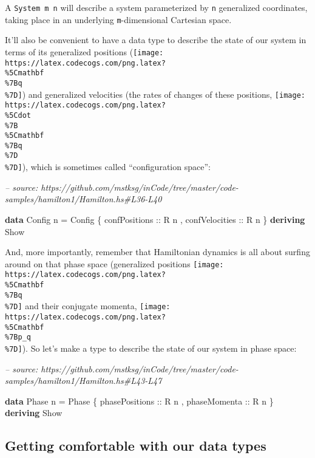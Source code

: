 \documentclass[]{article}
\newenvironment{Shaded}{}{}
\newcommand{\CommentTok}[1]{\textcolor[rgb]{0.38,0.63,0.69}{\textit{#1}}}
\newcommand{\DataTypeTok}[1]{\textcolor[rgb]{0.56,0.13,0.00}{#1}}
\newcommand{\FunctionTok}[1]{\textcolor[rgb]{0.02,0.16,0.49}{#1}}
\newcommand{\KeywordTok}[1]{\textcolor[rgb]{0.00,0.44,0.13}{\textbf{#1}}}
\newcommand{\NormalTok}[1]{#1}
\newcommand{\OtherTok}[1]{\textcolor[rgb]{0.00,0.44,0.13}{#1}}
\begin{document}
A \texttt{System\ m\ n} will describe a system parameterized by \texttt{n}
generalized coordinates, taking place in an underlying \texttt{m}-dimensional
Cartesian space.

It'll also be convenient to have a data type to describe the state of our system
in terms of its generalized positions
(\texttt{[image: https://latex.codecogs.com/png.latex?\\\%5Cmathbf\\\%7Bq\\\%7D]}) and
generalized velocities (the rates of changes of these positions,
\texttt{[image: https://latex.codecogs.com/png.latex?\\\%5Cdot\\\%7B\\\%5Cmathbf\\\%7Bq\\\%7D\\\%7D]}),
which is sometimes called ``configuration space'':

\begin{Shaded}
\begin{Highlighting}[]
\CommentTok{-- source: https://github.com/mstksg/inCode/tree/master/code-samples/hamilton1/Hamilton.hs#L36-L40}

\KeywordTok{data} \DataTypeTok{Config}\NormalTok{ n }\FunctionTok{=} \DataTypeTok{Config}
\NormalTok{    \{}\OtherTok{ confPositions  ::} \DataTypeTok{R}\NormalTok{ n}
\NormalTok{    ,}\OtherTok{ confVelocities ::} \DataTypeTok{R}\NormalTok{ n}
\NormalTok{    \}}
  \KeywordTok{deriving} \DataTypeTok{Show}
\end{Highlighting}
\end{Shaded}

And, more importantly, remember that Hamiltonian dynamics is all about surfing
around on that phase space (generalized positions
\texttt{[image: https://latex.codecogs.com/png.latex?\\\%5Cmathbf\\\%7Bq\\\%7D]} and
their conjugate momenta,
\texttt{[image: https://latex.codecogs.com/png.latex?\\\%5Cmathbf\\\%7Bp\_q\\\%7D]}).
So let's make a type to describe the state of our system in phase space:

\begin{Shaded}
\begin{Highlighting}[]
\CommentTok{-- source: https://github.com/mstksg/inCode/tree/master/code-samples/hamilton1/Hamilton.hs#L43-L47}

\KeywordTok{data} \DataTypeTok{Phase}\NormalTok{ n }\FunctionTok{=} \DataTypeTok{Phase}
\NormalTok{    \{}\OtherTok{ phasePositions ::} \DataTypeTok{R}\NormalTok{ n}
\NormalTok{    ,}\OtherTok{ phaseMomenta   ::} \DataTypeTok{R}\NormalTok{ n}
\NormalTok{    \}}
  \KeywordTok{deriving} \DataTypeTok{Show}
\end{Highlighting}
\end{Shaded}

\hypertarget{getting-comfortable-with-our-data-types}{%
\subsection{Getting comfortable with our data
types}\label{getting-comfortable-with-our-data-types}}
\end{document}
